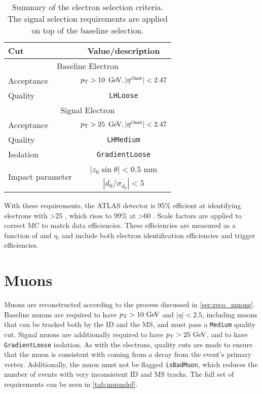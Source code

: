 \begin{table}[ph!]
\begin{center}
    \begin{tabular}{l|c}
      \hline
      Cut            & Value/description \\
      \hline
      \hline
      \multicolumn{2}{c}{Baseline Electron}\\
      \hline
      Acceptance   & $\pt > 10\,\GeV, |\eta^\mathrm{clust}| < 2.47$ \\
      Quality      & \texttt{LHLoose} \\
      \hline
      \multicolumn{2}{c}{Signal Electron}\\
      \hline
      Acceptance   & $\pt > 25\,\GeV, |\eta^\mathrm{clust}| < 2.47$ \\
      Quality          & \texttt{LHMedium} \\
      Isolation        & \texttt{GradientLoose} \\
      \multirow{2}{*}{Impact parameter} & $|z_0 \sin\theta|< 0.5$ mm \\
                       & $|d_0/\sigma_{d_0}|< 5$ \\ 
      \hline
      \hline
\end{tabular}
\end{center}
\caption{Summary of the electron selection criteria. The signal selection requirements are applied on top of the baseline selection.
  }              
\label{tab:eledef}
\end{table}

With these requirements, the ATLAS detector is 95\% efficient at identifying electrons with \pt>25 \gev, which rises to 99\% at \pt>60 \gev \cite{ATLAS-CONF-2014-032}. Scale factors are applied to correct \ac{MC} to match data efficiencies. These efficiencies are measured as a function of \pt and $\eta$, and include both electron identification efficiencies and trigger efficiencies. 

\section{Muons}

Muons are reconstructed according to the process discussed in \autoref{sec:reco_muons}. Baseline muons are required to have $\pt>10\gev$ and $|\eta|<2.5$, including muons that can be tracked both by the \ac{ID} and the \ac{MS}, and must pass a \texttt{Medium} quality cut. Signal muons are additionally required to have $\pt>25\gev$, and to have \texttt{GradientLoose} isolation. As with the electrons, quality cuts are made to ensure that the muon is consistent with coming from a decay from the event's primary vertex. Additionally, the muon must not be flagged \texttt{isBadMuon}, which reduces the number of events with very inconsistent \ac{ID} and \ac{MS} tracks. The full set of requirements can be seen in \autoref{tab:muondef}.

